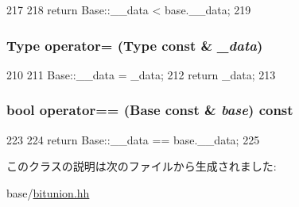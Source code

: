 \begin{DoxyCode}
217         {
218             return Base::__data < base.__data;
219         }
\end{DoxyCode}
\hypertarget{classBitfieldBackend_1_1BitUnionOperators_a001b4643ed067a61bedf2b991b675902}{
\subsubsection[{operator=}]{\setlength{\rightskip}{0pt plus 5cm}Type operator= (Type const \& {\em \_\-data})}}
\label{classBitfieldBackend_1_1BitUnionOperators_a001b4643ed067a61bedf2b991b675902}



\begin{DoxyCode}
210         {
211             Base::__data = _data;
212             return _data;
213         }
\end{DoxyCode}
\hypertarget{classBitfieldBackend_1_1BitUnionOperators_aa3dda9b980015ebdb371d6bdd3facb00}{
\subsubsection[{operator==}]{\setlength{\rightskip}{0pt plus 5cm}bool operator== (Base const \& {\em base}) const}}
\label{classBitfieldBackend_1_1BitUnionOperators_aa3dda9b980015ebdb371d6bdd3facb00}



\begin{DoxyCode}
223         {
224             return Base::__data == base.__data;
225         }
\end{DoxyCode}


このクラスの説明は次のファイルから生成されました:\begin{DoxyCompactItemize}
\item 
base/\hyperlink{bitunion_8hh}{bitunion.hh}\end{DoxyCompactItemize}

